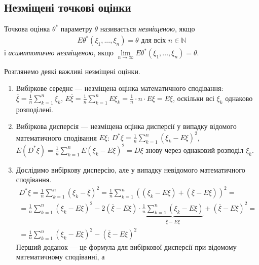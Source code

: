 \subsection{Незміщені точкові оцінки}
 \begin{definition}
    Точкова оцінка $\theta^*$ параметру $\theta$ називається \emph{незміщеною}, якщо
    \begin{gather}\label{estim_unbiased}
        E\theta^*(\xi_1, ..., \xi_n) = \theta \text{ для всіх } n\in\mathbb{N}
    \end{gather} 
    і \emph{асимптотично незміщеною}, якщо $\underset{n\to\infty}{\lim} E\theta^*(\xi_1, ..., \xi_n) = \theta$.
 \end{definition}
 \begin{example} 
    Розглянемо деякі важливі незміщені оцінки.
    \begin{enumerate}
        \item Вибіркове середнє --- незміщена оцінка математичного сподівання:
        $\overline{\xi} = \frac{1}{n}\sum\limits_{k=1}^n \xi_k$, $E\overline{\xi} = \frac{1}{n}\sum\limits_{k=1}^n E\xi_k = \frac{1}{n} \cdot{n} \cdot{E\xi} = E\xi$,
        оскільки всі $\xi_k$ однаково розподілені.
        \item Вибіркова дисперсія --- незміщена оцінка дисперсії у випадку відомого математичного сподівання $E\xi$:
        $D^*\xi = \frac{1}{n}\sum\limits_{k=1}^n \left(\xi_k - E\xi \right)^2$, 
        $E\left( D^* \xi\right) = \frac{1}{n}\sum\limits_{k=1}^n E\left(\xi_k - E\xi \right)^2 = D\xi$ знову через однаковий розподіл $\xi_k$.
        \item Дослідимо вибіркову дисперсію, але у випадку невідомого математичного сподівання. 
        \begin{gather*}
            D^*\xi = \frac{1}{n}\sum\limits_{k=1}^n \left(\xi_k - \overline{\xi} \right)^2 = 
            \frac{1}{n}\sum\limits_{k=1}^n \left((\xi_k - E\xi) + (\overline{\xi} - E\xi) \right)^2 =  \\
            = \frac{1}{n}\sum\limits_{k=1}^n \left(\xi_k - E\xi \right)^2 - 2\left(\overline{\xi} - E\xi\right)\cdot 
            \underbrace{\frac{1}{n}\sum\limits_{k=1}^n \left(\xi_k - E\xi\right)}_{\overline{\xi} - E\xi} + \left(\overline{\xi} - E\xi\right)^2 = \\
            = \frac{1}{n}\sum\limits_{k=1}^n \left(\xi_k - E\xi \right)^2 - \left(\overline{\xi} - E\xi\right)^2
        \end{gather*}
        Перший доданок --- це формула для вибіркової дисперсії при відомому математичному сподіванні, а 

\end{enumerate}
\end{example}
